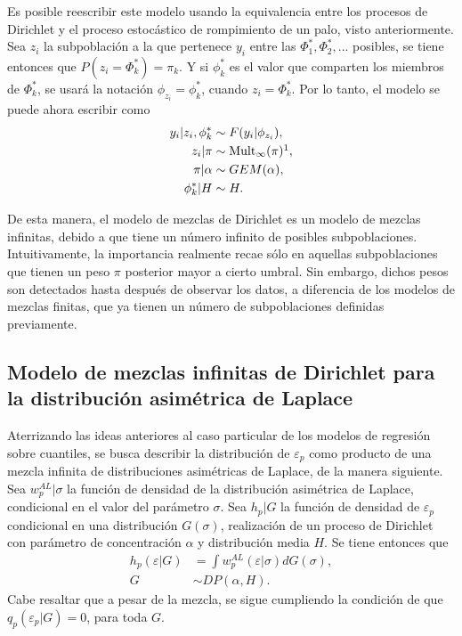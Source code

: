 Es posible reescribir este modelo usando la equivalencia entre los procesos de Dirichlet y el proceso estoc\'astico de rompimiento de un palo, visto anteriormente. Sea $z_i$ la subpoblaci\'on a la que pertenece $y_i$ entre las $\Phi_1^*,\Phi_2^*,...$ posibles, se tiene entonces que $P(z_i = \Phi_k^*) = \pi_k$. Y si $\phi_k^*$ es el valor que comparten los miembros de $\Phi_k^*$, se usar\'a la notaci\'on $\phi_{z_i} = \phi_k^*$, cuando $z_i = \Phi_k^*$. Por lo tanto, el modelo se puede ahora escribir como
\begin{equation*}
\begin{aligned}
   y_i | z_i, \phi_k^* &\sim F(y_i | \phi_{z_i}), \\
   z_i|\pi &\sim \mathrm{Mult}_{\infty}(\pi) \footnotemark, \\
   \pi | \alpha &\sim GEM(\alpha), \\
   \phi_k^* | H &\sim H.
\end{aligned}
\end{equation*}


De esta manera, el modelo de mezclas de Dirichlet es un modelo de mezclas infinitas, debido a que tiene un n\'umero infinito de posibles subpoblaciones. Intuitivamente, la importancia realmente recae s\'olo en aquellas subpoblaciones que tienen un peso $\pi$ posterior mayor a cierto umbral. Sin embargo, dichos pesos son detectados hasta despu\'es de observar los datos, a diferencia de los modelos de mezclas finitas, que ya tienen un n\'umero de subpoblaciones definidas previamente.

\subsection{Modelo de mezclas infinitas de Dirichlet para la distribuci\'on asim\'etrica de Laplace}

Aterrizando las ideas anteriores al caso particular de los modelos de regresi\'on sobre cuantiles, se busca describir la distribuci\'on de $\varepsilon_p$ como producto de una mezcla infinita de distribuciones asim\'etricas de Laplace, de la manera siguiente. Sea $w_p^{AL} | \sigma$ la funci\'on de densidad de la distribuci\'on asim\'etrica de Laplace, condicional en el valor del par\'ametro $\sigma$. Sea $h_p|G$ la funci\'on de densidad de $\varepsilon_p$ condicional en una distribuci\'on $G(\sigma)$, realizaci\'on de un proceso de Dirichlet con par\'ametro de concentraci\'on $\alpha$ y distribuci\'on media $H$. Se tiene entonces que
\begin{equation*}
\begin{aligned}
    h_p(\varepsilon|G) &= \int w_p^{AL}(\varepsilon|\sigma)dG(\sigma), \\
    G &\sim DP(\alpha,H).
\end{aligned}
\end{equation*}
Cabe resaltar que a pesar de la mezcla, se sigue cumpliendo la condici\'on de que $q_p(\varepsilon_p|G) = 0$, para toda $G$.

